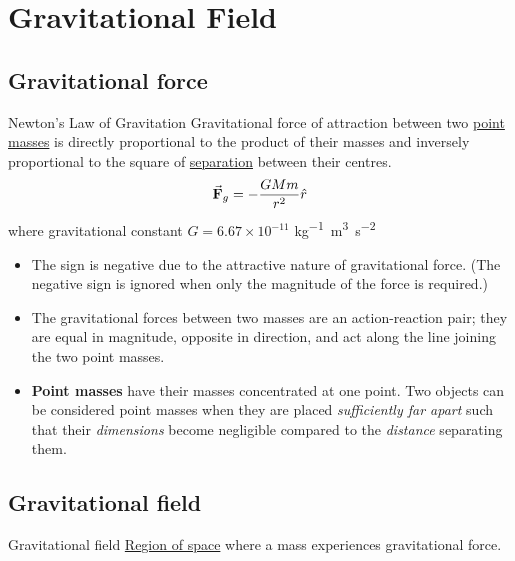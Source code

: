 \section{Gravitational Field}
\subsection{Gravitational force}
\begin{defn}{Newton's Law of Gravitation}{}
Gravitational force of attraction between two \underline{point masses} is directly proportional to the product of their masses and inversely proportional to the square of \underline{separation} between their centres.
\begin{equation} \va{F}_g = -\frac{GMm}{r^2}\hat{r} \end{equation}
where gravitational constant $G = 6.67 \times 10^{-11}$ \unit{kg^{-1}.m^3.s^{-2}}
\end{defn} 

\begin{itemize}
    \item The sign is negative due to the attractive nature of gravitational force. (The negative sign is ignored when only the magnitude of the force is required.)
    \item The gravitational forces between two masses are an action-reaction pair; they are equal in magnitude, opposite in direction, and act along the line joining the two point masses.
    \item \textbf{Point masses} have their masses concentrated at one point. Two objects can be considered point masses when they are placed \emph{sufficiently far apart} such that their \emph{dimensions} become negligible compared to the \emph{distance} separating them.
\end{itemize}

\subsection{Gravitational field}
\begin{defn}{Gravitational field}{}
\underline{Region of space} where a mass experiences gravitational force.
\end{defn}

